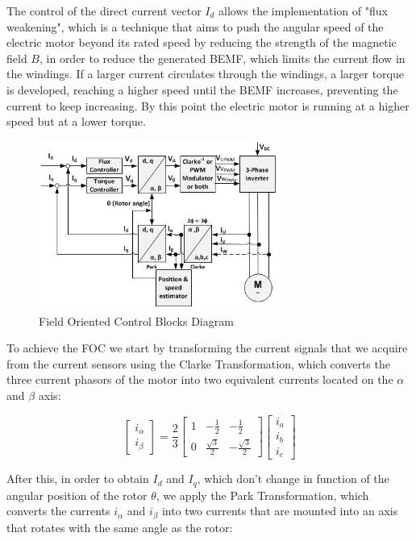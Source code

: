 The control of the direct current vector $I_{d}$ allows the implementation of "flux weakening", which is a technique that aims to push the angular speed of the electric motor beyond its rated speed by reducing the strength of the magnetic field $B$, in order to reduce the generated \ac{BEMF}, which limits the current flow in the windings. If a larger current circulates through the windings, a larger torque is developed, reaching a higher speed until the \ac{BEMF} increases, preventing the current to keep increasing. By this point the electric motor is running at a higher speed but at a lower torque.

\begin{figure}[htbp]
\centering
\includegraphics[width=8cm]{Images/foc_current.png} 
\caption[Field Oriented Control Blocks Diagram]{Field Oriented Control Blocks Diagram}
\label{fig:foc_current}
\end{figure}

To achieve the \ac{FOC} we start by transforming the current signals that we acquire from the current sensors using the Clarke Transformation, which converts the three current phasors of the motor into two equivalent currents located on the $\alpha$ and $\beta$ axis:

\[
\begin{bmatrix}
i_{\alpha}\\ 
i_{\beta}
\end{bmatrix}
=
\frac{2}{3}
\begin{bmatrix}
1 & -\frac{1}{2} & -\frac{1}{2}\\ 
0 & \frac{\sqrt{3}}{2} & -\frac{\sqrt{3}}{2}
\end{bmatrix}
\begin{bmatrix}
i_{a}\\
i_{b}\\
i_{c}
\end{bmatrix}
\]

After this, in order to obtain $I_{d}$ and $I_{q}$, which don't change in function of the angular position of the rotor $\theta$, we apply the Park Transformation, which converts the currents $i_{\alpha}$ and $i_{\beta}$ into two currents that are mounted into an axis that rotates with the same angle as the rotor:

